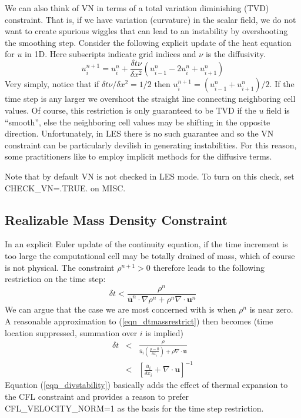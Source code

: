 We can also think of VN in terms of a total variation diminishing (TVD) constraint.  That is, if we have variation (curvature) in the scalar field, we do not want to create spurious wiggles that can lead to an instability by overshooting the smoothing step.  Consider the following explicit update of the heat equation for $u$ in 1D. Here subscripts indicate grid indices and $\nu$ is the diffusivity.
\begin{equation}
u_i^{n+1} = u_i^n + \frac{\delta t \nu}{\delta x^2} (u_{i-1}^n - 2u_i^n + u_{i+1}^n )
\end{equation}
Very simply, notice that if $\delta t \nu/\delta x^2 = 1/2$ then $u_i^{n+1} = (u_{i-1}^n + u_{i+1}^n)/2$.  If the time step is any larger we overshoot the straight line connecting neighboring cell values.  Of course, this restriction is only guaranteed to be TVD if the $u$ field is ``smooth'', else the neighboring cell values may be shifting in the opposite direction.  Unfortunately, in LES there is no such guarantee and so the VN constraint can be particularly devilish in generating instabilities. For this reason, some practitioners like to employ implicit methods for the diffusive terms.

Note that by default VN is not checked in LES mode.  To turn on this check, set {\ct CHECK\_VN=.TRUE.} on {\ct MISC}.

\subsection{Realizable Mass Density Constraint}

In an explicit Euler update of the continuity equation, if the time increment is too large the computational cell may be totally drained of mass, which of course is not physical. The constraint $\rho^{n+1}>0$ therefore leads to the following restriction on the time step:
\begin{equation}
\label{eqn_dtmassrestrict}
\delta t < \frac{\rho^n}{\overline{\mathbf{u}}^n\cdot\nabla\rho^n + \rho^n \nabla\cdot\mathbf{u}^n}
\end{equation}
We can argue that the case we are most concerned with is when $\rho^n$ is near zero.  A reasonable approximation to (\ref{eqn_dtmassrestrict}) then becomes (time location suppressed, summation over $i$ is implied)
\begin{eqnarray}
\label{eqn_divstability}
\delta t &<& \frac{\rho}{\overline{u}_i \left(\frac{\rho-0}{\delta x_i}\right) + \rho \nabla\cdot\mathbf{u}} \nonumber\\
&<& \left[ \frac{\overline{u}_i}{\delta x_i} + \nabla\cdot\mathbf{u} \right]^{-1}
\end{eqnarray}
Equation (\ref{eqn_divstability}) basically adds the effect of thermal expansion to the CFL constraint and provides a reason to prefer {\ct CFL\_VELOCITY\_NORM=1} as the basis for the time step restriction.

